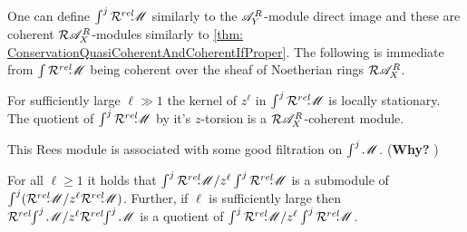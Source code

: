 One can define $\int^j \mathcal{R}^{rel}\mkern-5mu \mathscr{M}$ similarly to the $\mathscr{A}_Y^R$-module direct image and these are coherent $\mathcal{R}\mathscr{A}_X^R$-modules similarly to \cref{thm: ConservationQuasiCoherentAndCoherentIfProper}.
The following is immediate from $\int \mathcal{R}^{rel}\mkern-5mu \mathscr{M}$ being coherent over the sheaf of Noetherian rings $\mathcal{R}\mathscr{A}_X^R$.
\begin{lemma}
  For sufficiently large $\ell \gg 1$ the kernel of $z^\ell$ in $\int^j \mathcal{R}^{rel}\mkern-5mu \mathscr{M}$ is locally stationary. The quotient of $\int^j \mathcal{R}^{rel}\mkern-5mu \mathscr{M}$ by it's $z$-torsion is a $\mathcal{R} \mathscr{A}_X^R$-coherent module.
\end{lemma}
This Rees module is associated with some good filtration on $\int^j \mathscr{M}$. (\textbf{Why? })
\begin{corollary}
    For all $\ell \geq 1$ it holds that $\int^j \mathcal{R}^{rel}\mkern-5mu\mathscr{M} / z^\ell\int^j \mathcal{R}^{rel}\mkern-5mu \mathscr{M}$ is a submodule of $\int^j (\mathcal{R}^{rel}\mkern-5mu \mathscr{M} / z^\ell \mathcal{R}^{rel}\mkern-5mu \mathscr{M})$. Further, if $\ell$ is sufficiently large then $\mathcal{R}^{rel}\mkern-5mu \int^j\mathscr{M} / z^\ell \mathcal{R}^{rel}\mkern-5mu \int^j \mathscr{M}$ is a quotient of $\int^j \mathcal{R}^{rel}\mkern-5mu \mathscr{M} / z^\ell \int^j \mathcal{R}^{rel}\mkern-5mu \mathscr{M}$. 
\end{corollary}
